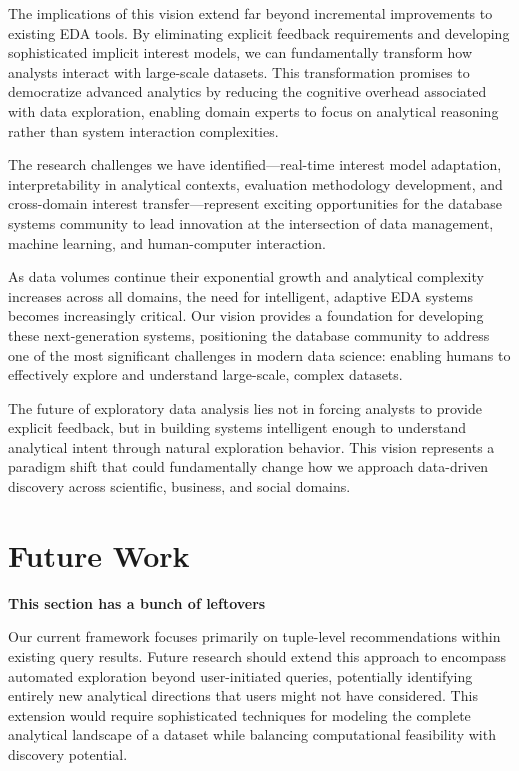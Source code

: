 \documentclass[sigconf, nonacm]{acmart}
\begin{document}
The implications of this vision extend far beyond incremental improvements to existing EDA tools. By eliminating explicit feedback requirements and developing sophisticated implicit interest models, we can fundamentally transform how analysts interact with large-scale datasets. This transformation promises to democratize advanced analytics by reducing the cognitive overhead associated with data exploration, enabling domain experts to focus on analytical reasoning rather than system interaction complexities.

The research challenges we have identified—real-time interest model adaptation, interpretability in analytical contexts, evaluation methodology development, and cross-domain interest transfer—represent exciting opportunities for the database systems community to lead innovation at the intersection of data management, machine learning, and human-computer interaction.

As data volumes continue their exponential growth and analytical complexity increases across all domains, the need for intelligent, adaptive EDA systems becomes increasingly critical. Our vision provides a foundation for developing these next-generation systems, positioning the database community to address one of the most significant challenges in modern data science: enabling humans to effectively explore and understand large-scale, complex datasets.

The future of exploratory data analysis lies not in forcing analysts to provide explicit feedback, but in building systems intelligent enough to understand analytical intent through natural exploration behavior. This vision represents a paradigm shift that could fundamentally change how we approach data-driven discovery across scientific, business, and social domains.

\section{Future Work}

\textbf{This section has a bunch of leftovers}

Our current framework focuses primarily on tuple-level recommendations within existing query results. Future research should extend this approach to encompass automated exploration beyond user-initiated queries, potentially identifying entirely new analytical directions that users might not have considered. This extension would require sophisticated techniques for modeling the complete analytical landscape of a dataset while balancing computational feasibility with discovery potential.
\end{document}
